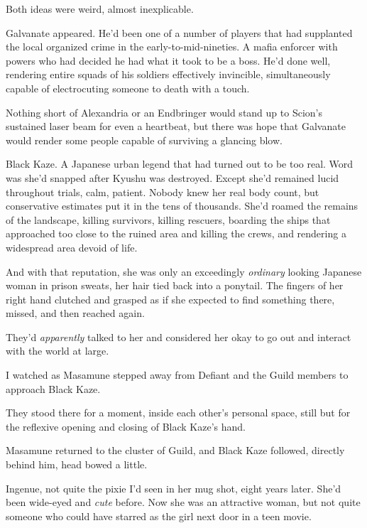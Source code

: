 Both ideas were weird, almost inexplicable.



Galvanate appeared.  He'd been one of a number of players that had supplanted the local organized crime in the early-to-mid-nineties.  A mafia enforcer with powers who had decided he had what it took to be a boss.  He'd done well, rendering entire squads of his soldiers effectively invincible, simultaneously capable of electrocuting someone to death with a touch.



Nothing short of Alexandria or an Endbringer would stand up to Scion's sustained laser beam for even a heartbeat, but there was hope that Galvanate would render some people capable of surviving a glancing blow.



Black Kaze.  A Japanese urban legend that had turned out to be too real.  Word was she'd snapped after Kyushu was destroyed.  Except she'd remained lucid throughout trials, calm, patient.  Nobody knew her real body count, but conservative estimates put it in the tens of thousands.  She'd roamed the remains of the landscape, killing survivors, killing rescuers, boarding the ships that approached too close to the ruined area and killing the crews, and rendering a widespread area devoid of life.



And with that reputation, she was only an exceedingly \emph{ordinary} looking Japanese woman in prison sweats, her hair tied back into a ponytail.  The fingers of her right hand clutched and grasped as if she expected to find something there, missed, and then reached again.



They'd \emph{apparently} talked to her and considered her okay to go out and interact with the world at large.



I watched as Masamune stepped away from Defiant and the Guild members to approach Black Kaze.



They stood there for a moment, inside each other's personal space, still but for the reflexive opening and closing of Black Kaze's hand.



Masamune returned to the cluster of Guild, and Black Kaze followed, directly behind him, head bowed a little.



Ingenue, not quite the pixie I'd seen in her mug shot, eight years later.  She'd been wide-eyed and \emph{cute} before.  Now she was an attractive woman, but not quite someone who could have starred as the girl next door in a teen movie.



